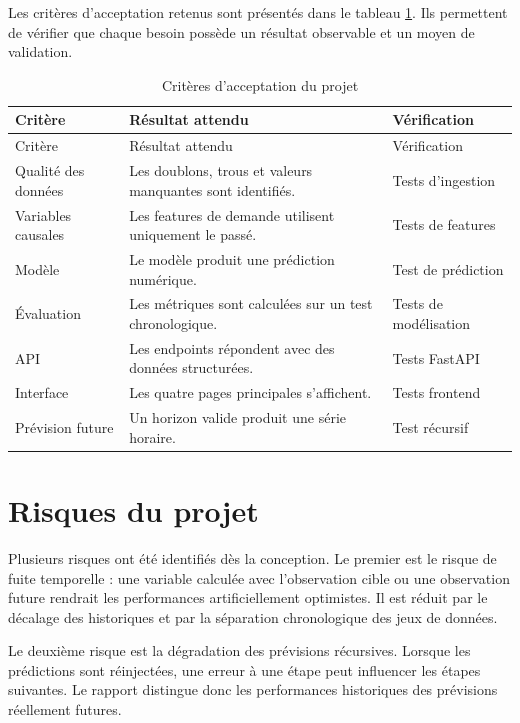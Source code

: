 \documentclass[12pt,a4paper]{report}
\begin{document}
Les critères d'acceptation retenus sont présentés dans le tableau
\ref{tab:criteres-acceptation}. Ils permettent de vérifier que chaque besoin
possède un résultat observable et un moyen de validation.

\begin{longtable}{p{} p{} p{}}
\caption{Critères d'acceptation du projet}\label{tab:criteres-acceptation}\\
\toprule
Critère & Résultat attendu & Vérification \\
\midrule
\endfirsthead
\toprule
Critère & Résultat attendu & Vérification \\
\midrule
\endhead
Qualité des données & Les doublons, trous et valeurs manquantes sont identifiés. & Tests d'ingestion \\
Variables causales & Les features de demande utilisent uniquement le passé. & Tests de features \\
Modèle & Le modèle produit une prédiction numérique. & Test de prédiction \\
Évaluation & Les métriques sont calculées sur un test chronologique. & Tests de modélisation \\
API & Les endpoints répondent avec des données structurées. & Tests FastAPI \\
Interface & Les quatre pages principales s'affichent. & Tests frontend \\
Prévision future & Un horizon valide produit une série horaire. & Test récursif \\
\bottomrule
\end{longtable}

\section{Risques du projet}

Plusieurs risques ont été identifiés dès la conception. Le premier est le
risque de fuite temporelle : une variable calculée avec l'observation cible
ou une observation future rendrait les performances artificiellement
optimistes. Il est réduit par le décalage des historiques et par la séparation
chronologique des jeux de données.

Le deuxième risque est la dégradation des prévisions récursives. Lorsque les
prédictions sont réinjectées, une erreur à une étape peut influencer les
étapes suivantes. Le rapport distingue donc les performances historiques des
prévisions réellement futures.
\end{document}
